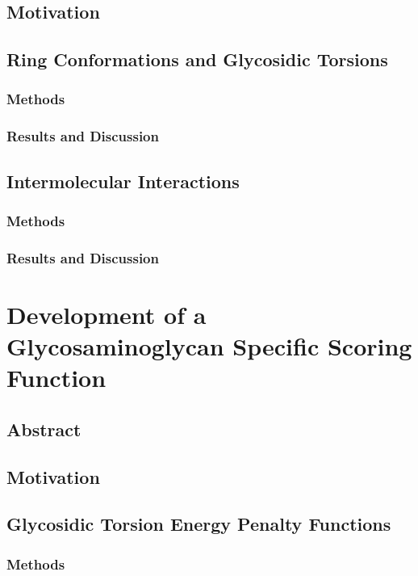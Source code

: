 \documentclass[a4paper, 12pt, openany]{book}
\begin{document}
\section{Motivation}

\section{Ring Conformations and Glycosidic Torsions}
\subsection{Methods}

\subsection{Results and Discussion}

\section{Intermolecular Interactions}
\subsection{Methods}

\subsection{Results and Discussion}

\chapter{Development of a Glycosaminoglycan Specific Scoring Function}
\section{Abstract}

\section{Motivation}

\section{Glycosidic Torsion Energy Penalty Functions}
\subsection{Methods}
\end{document}
